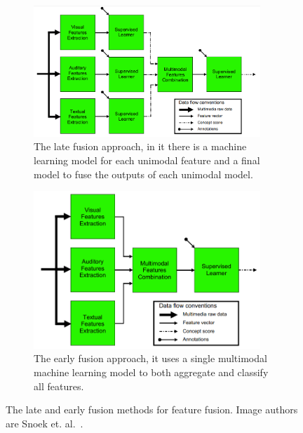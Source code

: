 \begin{figure}[!ht]
    \centering
    \begin{subfigure}[b]{0.55\textwidth}
        \includegraphics[width=0.94\textwidth]{img/late-fusion.png}
        \caption{The late fusion approach, in it there is a machine learning model for each unimodal feature and a final model to fuse the outputs of each unimodal model.}
        \label{fig:early-fusion}
    \end{subfigure}
    \begin{subfigure}[b]{0.44\textwidth}
        \includegraphics[width=0.94\textwidth]{img/early-fusion.png}
        \caption{The early fusion approach, it uses a single multimodal machine learning model to both aggregate and classify all features.}
        \label{fig:late-fusion}
    \end{subfigure}
    \caption{The late and early fusion methods for feature fusion. Image authors are Snoek et. al.~\cite{snoek2005featurefusion}.}
\end{figure}
